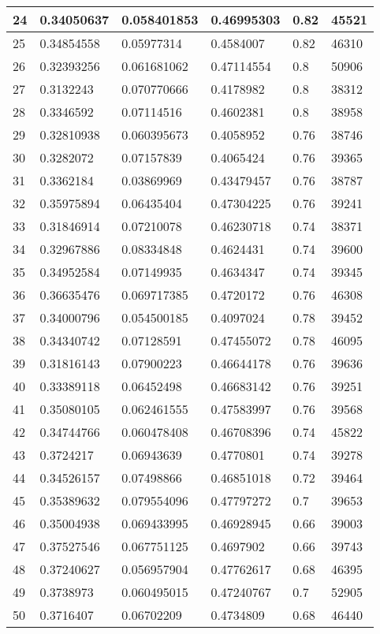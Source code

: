 \begin{longtable}{|l|l|l|l|l|l|}
24 & 0.34050637 & 0.058401853 & 0.46995303 & 0.82 & 45521 \\ \hline 
25 & 0.34854558 & 0.05977314 & 0.4584007 & 0.82 & 46310 \\ \hline 
26 & 0.32393256 & 0.061681062 & 0.47114554 & 0.8 & 50906 \\ \hline 
27 & 0.3132243 & 0.070770666 & 0.4178982 & 0.8 & 38312 \\ \hline 
28 & 0.3346592 & 0.07114516 & 0.4602381 & 0.8 & 38958 \\ \hline 
29 & 0.32810938 & 0.060395673 & 0.4058952 & 0.76 & 38746 \\ \hline 
30 & 0.3282072 & 0.07157839 & 0.4065424 & 0.76 & 39365 \\ \hline 
31 & 0.3362184 & 0.03869969 & 0.43479457 & 0.76 & 38787 \\ \hline 
32 & 0.35975894 & 0.06435404 & 0.47304225 & 0.76 & 39241 \\ \hline 
33 & 0.31846914 & 0.07210078 & 0.46230718 & 0.74 & 38371 \\ \hline 
34 & 0.32967886 & 0.08334848 & 0.4624431 & 0.74 & 39600 \\ \hline 
35 & 0.34952584 & 0.07149935 & 0.4634347 & 0.74 & 39345 \\ \hline 
36 & 0.36635476 & 0.069717385 & 0.4720172 & 0.76 & 46308 \\ \hline 
37 & 0.34000796 & 0.054500185 & 0.4097024 & 0.78 & 39452 \\ \hline 
38 & 0.34340742 & 0.07128591 & 0.47455072 & 0.78 & 46095 \\ \hline 
39 & 0.31816143 & 0.07900223 & 0.46644178 & 0.76 & 39636 \\ \hline 
40 & 0.33389118 & 0.06452498 & 0.46683142 & 0.76 & 39251 \\ \hline 
41 & 0.35080105 & 0.062461555 & 0.47583997 & 0.76 & 39568 \\ \hline 
42 & 0.34744766 & 0.060478408 & 0.46708396 & 0.74 & 45822 \\ \hline 
43 & 0.3724217 & 0.06943639 & 0.4770801 & 0.74 & 39278 \\ \hline 
44 & 0.34526157 & 0.07498866 & 0.46851018 & 0.72 & 39464 \\ \hline 
45 & 0.35389632 & 0.079554096 & 0.47797272 & 0.7 & 39653 \\ \hline 
46 & 0.35004938 & 0.069433995 & 0.46928945 & 0.66 & 39003 \\ \hline 
47 & 0.37527546 & 0.067751125 & 0.4697902 & 0.66 & 39743 \\ \hline 
48 & 0.37240627 & 0.056957904 & 0.47762617 & 0.68 & 46395 \\ \hline 
49 & 0.3738973 & 0.060495015 & 0.47240767 & 0.7 & 52905 \\ \hline 
50 & 0.3716407 & 0.06702209 & 0.4734809 & 0.68 & 46440 \\ \hline 
\end{longtable}
